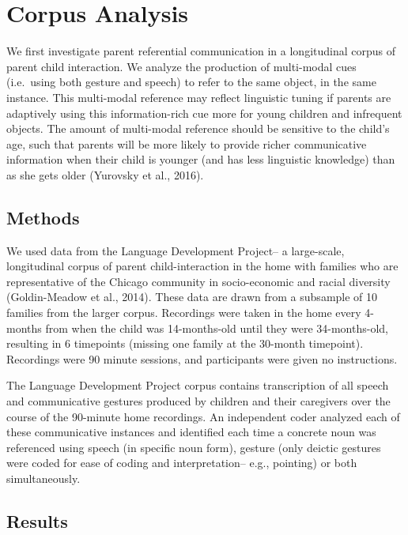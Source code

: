 \documentclass[10pt, letterpaper]{article}
\begin{document}
\section{Corpus Analysis}\label{corpus-analysis}

We first investigate parent referential communication in a longitudinal
corpus of parent child interaction. We analyze the production of
multi-modal cues (i.e.~using both gesture and speech) to refer to the
same object, in the same instance. This multi-modal reference may
reflect linguistic tuning if parents are adaptively using this
information-rich cue more for young children and infrequent objects. The
amount of multi-modal reference should be sensitive to the child's age,
such that parents will be more likely to provide richer communicative
information when their child is younger (and has less linguistic
knowledge) than as she gets older (Yurovsky et al., 2016).

\subsection{Methods}\label{methods}

We used data from the Language Development Project-- a large-scale,
longitudinal corpus of parent child-interaction in the home with
families who are representative of the Chicago community in
socio-economic and racial diversity (Goldin-Meadow et al., 2014). These
data are drawn from a subsample of 10 families from the larger corpus.
Recordings were taken in the home every 4-months from when the child was
14-months-old until they were 34-months-old, resulting in 6 timepoints
(missing one family at the 30-month timepoint). Recordings were 90
minute sessions, and participants were given no instructions.

The Language Development Project corpus contains transcription of all
speech and communicative gestures produced by children and their
caregivers over the course of the 90-minute home recordings. An
independent coder analyzed each of these communicative instances and
identified each time a concrete noun was referenced using speech (in
specific noun form), gesture (only deictic gestures were coded for ease
of coding and interpretation-- e.g., pointing) or both simultaneously.

\subsection{Results}\label{results}
\end{document}
